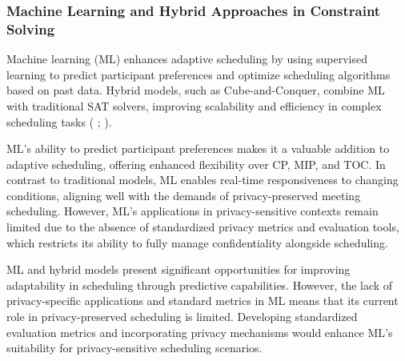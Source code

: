 \begin{spacing}{1.0}
    \subsubsection{Machine Learning and Hybrid Approaches in Constraint Solving}
    \indent \indent Machine learning (ML) enhances adaptive scheduling by using supervised learning to predict participant preferences and optimize scheduling algorithms based on past data. Hybrid models, such as Cube-and-Conquer, combine ML with traditional SAT solvers, improving scalability and efficiency in complex scheduling tasks (\cite{andrei2022} ; \cite{marijn2011}).
    \par ML’s ability to predict participant preferences makes it a valuable addition to adaptive scheduling, offering enhanced flexibility over CP, MIP, and TOC. In contrast to traditional models, ML enables real-time responsiveness to changing conditions, aligning well with the demands of privacy-preserved meeting scheduling. However, ML’s applications in privacy-sensitive contexts remain limited due to the absence of standardized privacy metrics and evaluation tools, which restricts its ability to fully manage confidentiality alongside scheduling.
    \par ML and hybrid models present significant opportunities for improving adaptability in scheduling through predictive capabilities. However, the lack of privacy-specific applications and standard metrics in ML means that its current role in privacy-preserved scheduling is limited. Developing standardized evaluation metrics and incorporating privacy mechanisms would enhance ML’s suitability for privacy-sensitive scheduling scenarios.

\end{spacing}
